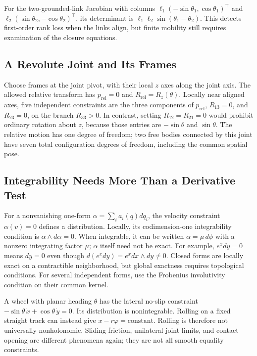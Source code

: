 For the two-grounded-link Jacobian with columns $\ell_1(-\sin\theta_1,\cos\theta_1)^\top$ and $\ell_2(\sin\theta_2,-\cos\theta_2)^\top$, its determinant is $\ell_1\ell_2\sin(\theta_1-\theta_2)$. This detects first-order rank loss when the links align, but finite mobility still requires examination of the closure equations.

\subsection{A Revolute Joint and Its Frames}

Choose frames at the joint pivot, with their local $z$ axes along the joint axis. The allowed relative transform has $p_{\mathrm{rel}}=0$ and $R_{\mathrm{rel}}=R_z(\theta)$. Locally near aligned axes, five independent constraints are the three components of $p_{\mathrm{rel}}$, $R_{13}=0$, and $R_{23}=0$, on the branch $R_{33}>0$. In contrast, setting $R_{12}=R_{21}=0$ would prohibit ordinary rotation about $z$, because those entries are $-\sin\theta$ and $\sin\theta$. The relative motion has one degree of freedom; two free bodies connected by this joint have seven total configuration degrees of freedom, including the common spatial pose.

\subsection{Integrability Needs More Than a Derivative Test}

For a nonvanishing one-form $\alpha=\sum_i a_i(q)dq_i$, the velocity constraint $\alpha(v)=0$ defines a distribution. Locally, its codimension-one integrability condition is $\alpha\wedge d\alpha=0$. When integrable, it can be written $\alpha=\mu\,d\phi$ with a nonzero integrating factor $\mu$; $\alpha$ itself need not be exact. For example, $e^xdy=0$ means $dy=0$ even though $d(e^xdy)=e^x dx\wedge dy\ne0$. Closed forms are locally exact on a contractible neighborhood, but global exactness requires topological conditions. For several independent forms, use the Frobenius involutivity condition on their common kernel.

A wheel with planar heading $\theta$ has the lateral no-slip constraint $-\sin\theta\,\dot x+\cos\theta\,\dot y=0$. Its distribution is nonintegrable. Rolling on a fixed straight track can instead give $x-r\varphi=\mathrm{constant}$. Rolling is therefore not universally nonholonomic. Sliding friction, unilateral joint limits, and contact opening are different phenomena again; they are not all smooth equality constraints.

